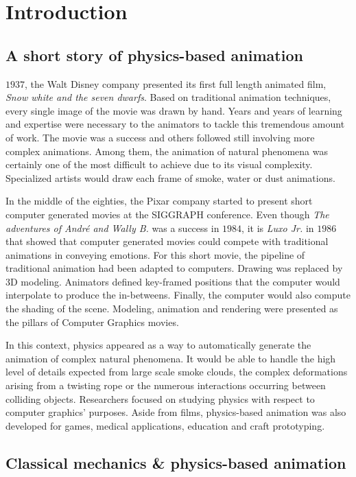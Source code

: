 \chapter[Introduction]{Introduction}
\label{chap:introduction}

\section{A short story of physics-based animation}
 $1937$, the Walt Disney company presented its first full length animated film, \emph{Snow white and the seven dwarfs}. Based on traditional animation techniques, every single image of the movie was drawn by hand. Years and years of learning and expertise were necessary to the animators to tackle this tremendous amount of work. The movie was a success and others followed still involving more complex animations. Among them, the animation of natural phenomena was certainly one of the most difficult to achieve due to its visual complexity. Specialized artists would draw each frame of smoke, water or dust animations.

In the middle of the eighties, the Pixar company started to present short computer generated movies at the SIGGRAPH conference. Even though \emph{The adventures of André and Wally B.} was a success in $1984$, it is \emph{Luxo Jr.} in $1986$ that showed that computer generated movies could compete with traditional animations in conveying emotions. For this short movie, the pipeline of traditional animation had been adapted to computers. Drawing was replaced by 3D modeling. Animators defined key-framed positions that the computer would interpolate to produce the in-betweens. Finally, the computer would also compute the shading of the scene. Modeling, animation and rendering were presented as the pillars of Computer Graphics movies.

In this context, physics appeared as a way to automatically generate the animation of complex natural phenomena. It would be able to handle the high level of details expected from large scale smoke clouds, the complex deformations arising from a twisting rope or the numerous interactions occurring between colliding objects. Researchers focused on studying physics with respect to computer graphics' purposes. Aside from films, physics-based animation was also developed for games, medical applications, education and craft prototyping.

\section{Classical mechanics \& physics-based animation}


